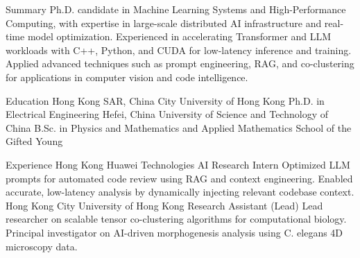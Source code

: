 \documentclass[caps, english]{financecv}
\begin{document}
\begin{cvsection}{Summary}
    Ph.D. candidate in Machine Learning Systems and High-Performance Computing, with expertise in large-scale distributed AI infrastructure and real-time model optimization. Experienced in accelerating Transformer and LLM workloads with C++, Python, and CUDA for low-latency inference and training. Applied advanced techniques such as prompt engineering, RAG, and co-clustering for applications in computer vision and code intelligence.
\end{cvsection}

\begin{cvsection}{Education}
    {Hong Kong SAR, China}
    {City University of Hong Kong}
    {}
    {Ph.D. in Electrical Engineering}
    {}
    {}
    {}
    {Hefei, China}
    {University of Science and Technology of China}
    {}
    {B.Sc. in Physics and Mathematics and Applied Mathematics}
    {School of the Gifted Young}
    {}
    {}
\end{cvsection}

\begin{cvsection}{Experience}
    {Hong Kong}
    {Huawei Technologies}
    {AI Research Intern}
    {Optimized LLM prompts for automated code review using RAG and context engineering. Enabled accurate, low-latency analysis by dynamically injecting relevant codebase context.}
    {}
    {}
    {}
    {Hong Kong}
    {City University of Hong Kong}
    {Research Assistant (Lead)}
    {Lead researcher on scalable tensor co-clustering algorithms for computational biology.  Principal investigator on AI-driven morphogenesis analysis using C. elegans 4D microscopy data.}
    {}
    {}
    {}
\end{cvsection}
\end{document}
